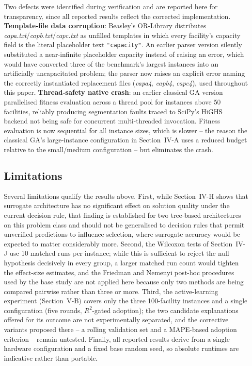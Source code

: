 \documentclass[conference]{IEEEtran}
\begin{document}
Two defects were identified during verification and are reported here for
transparency, since all reported results reflect the corrected
implementation. \textbf{Template-file data corruption}: Beasley's OR-Library
distributes \emph{capa.txt}/\emph{capb.txt}/\emph{capc.txt} as unfilled
templates in which every facility's capacity field is the literal placeholder
text \texttt{"capacity"}. An earlier parser version silently substituted a
near-infinite placeholder capacity instead of raising an error, which would
have converted three of the benchmark's largest instances into an
artificially uncapacitated problem; the parser now raises an explicit error
naming the correctly instantiated replacement files (\emph{capa4},
\emph{capb4}, \emph{capc4}), used throughout this paper. \textbf{Thread-safety
native crash}: an earlier classical GA version parallelised fitness
evaluation across a thread pool for instances above 50 facilities, reliably
producing segmentation faults traced to SciPy's HiGHS backend not being safe
for concurrent multi-threaded invocation. Fitness evaluation is now
sequential for all instance sizes, which is slower -- the reason the
classical GA's large-instance configuration in Section~IV-A uses a reduced
budget relative to the small/medium configuration -- but eliminates the
crash.

\subsection{Limitations}

Several limitations qualify the results above. First, while Section~IV-H shows
that surrogate architecture has no significant effect on solution quality under
the current decision rule, that finding is established for two tree-based
architectures on this problem class and should not be generalised to decision
rules that permit unverified predictions to influence selection, where
surrogate accuracy would be expected to matter considerably more. Second, the
Wilcoxon tests of Section~IV-J use 10 matched runs per instance; while this is
sufficient to reject the null hypothesis decisively in every group, a larger
matched run count would tighten the effect-size estimates, and the Friedman
and Nemenyi post-hoc procedures used by the base study \citep{ozsoydan2023}
are not applied here because only two methods are being compared pairwise
rather than three or more. Third, the active-learning experiment
(Section~V-B) covers only the three 100-facility instances and a single
configuration (five rounds, $R^2$-gated adoption); the two candidate
explanations offered for its outcome are not experimentally separated, and the
corrective variants proposed there -- a rolling validation set and a
MAPE-based adoption criterion -- remain untested. Finally, all reported
results derive from a single hardware configuration and a fixed base random
seed, so absolute runtimes are indicative rather than portable.
\end{document}
